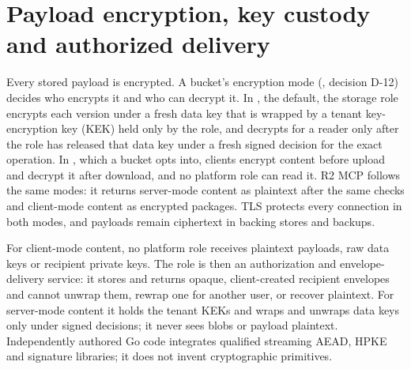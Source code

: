 \section{Payload encryption, key custody and authorized delivery}\label{sec:custody}
Every stored payload is encrypted. A bucket's encryption mode (, decision D-12) decides who encrypts it and who can decrypt it. In , the default, the storage role encrypts each version under a fresh data key that is wrapped by a tenant key-encryption key (KEK) held only by the  role, and decrypts for a reader only after the  role has released that data key under a fresh signed decision for the exact operation. In , which a bucket opts into, clients encrypt content before upload and decrypt it after download, and no platform role can read it. R2 MCP follows the same modes: it returns server-mode content as plaintext after the same checks and client-mode content as encrypted packages. TLS protects every connection in both modes, and payloads remain ciphertext in backing stores and backups.

For client-mode content, no platform role receives plaintext payloads, raw data keys or recipient private keys. The  role is then an authorization and envelope-delivery service: it stores and returns opaque, client-created recipient envelopes and cannot unwrap them, rewrap one for another user, or recover plaintext. For server-mode content it holds the tenant KEKs and wraps and unwraps data keys only under signed decisions; it never sees blobs or payload plaintext. Independently authored Go code integrates qualified streaming AEAD, HPKE and signature libraries; it does not invent cryptographic primitives.

